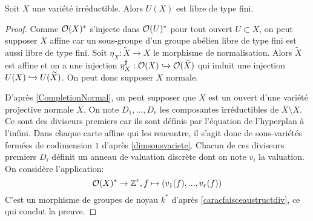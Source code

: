 \begin{prop}
Soit $X$ une variété irréductible. Alors $U(X)$ est libre de type fini.
\end{prop}
\begin{proof}
Comme $\mathcal{O}(X)^*$ s'injecte dans $\mathcal{O}(U)^*$ pour tout ouvert $U\subset X$, on peut supposer $X$ affine car un sous-groupe d'un groupe abélien libre de type fini est aussi libre de type fini. Soit $\eta_X:\widetilde{X}\rightarrow X$ le morphisme de normalisation. Alors $\widetilde{X}$ est affine et on a une injection $\eta_X^\sharp:\mathcal{O}(X)\xhookrightarrow{}\mathcal{O}(\widetilde{X})$ qui induit une injection $U(X)\xhookrightarrow{}U(\widetilde{X})$. On peut donc supposer $X$ normale.

D'après \ref{CompletionNormal}, on peut supposer que $X$ est un ouvert d'une variété projective normale $\bar{X}$. On note $D_1,...,D_r$ les composantes irréductibles de $\bar{X}\setminus X$. Ce sont des diviseurs premiers car ils sont définis par l'équation de l'hyperplan à l'infini. Dans chaque carte affine qui les rencontre, il s'agit donc de sous-variétés fermées de codimension $1$ d'après \ref{dimsousvariete}. Chacun de ces diviseurs premiers $D_i$ définit un anneau de valuation discrète dont on note $v_i$ la valuation. On considère l'application:
$$\mathcal{O}(X)^*\rightarrow \mathbb{Z}^r, f\mapsto (v_1(f),...,v_r(f))$$
C'est un morphisme de groupes de noyau $k^*$ d'après \ref{caracfaisceaustructdiv}, ce qui conclut la preuve.
\end{proof}

